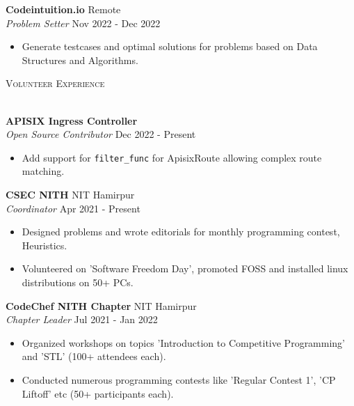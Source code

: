 \documentclass[a4paper]{article}
\newcommand{\lineunder} {
    \vspace*{-8pt} \\
    \hspace*{-18pt} \hrulefill \\
}
\newcommand{\header} [1] {
    {\hspace*{-18pt}\vspace*{6pt} \textsc{#1}}
    \vspace*{-6pt} \lineunder
}
\begin{document}
\textbf{Codeintuition.io} \hfill Remote\\
\textit{Problem Setter} \hfill Nov 2022 - Dec 2022\\
\begin{itemize}
	\item Generate testcases and optimal solutions for problems based on Data Structures and Algorithms.
\end{itemize}
\vspace{1.5mm}


\header{Volunteer Experience}
\vspace{1mm}

\textbf{APISIX Ingress Controller}\\
\textit{Open Source Contributor} \hfill Dec 2022 - Present\\
\begin{itemize}
	\item Add support for \texttt{filter\_func} for ApisixRoute allowing complex route matching.
\end{itemize}
\vspace{1.5mm}

\textbf{CSEC NITH} \hfill NIT Hamirpur\\
\textit{Coordinator} \hfill Apr 2021 - Present\\
\begin{itemize}
	\item Designed problems and wrote editorials for monthly programming contest, Heuristics.
	\item Volunteered on 'Software Freedom Day', promoted FOSS and installed linux distributions on 50+ PCs.
\end{itemize}
\vspace{1.5mm}

\textbf{CodeChef NITH Chapter} \hfill NIT Hamirpur\\
\textit{Chapter Leader} \hfill Jul 2021 - Jan 2022\\
\begin{itemize}
	\item Organized workshops on topics 'Introduction to Competitive Programming' and 'STL' (100+ attendees each).
	\item Conducted numerous programming contests like 'Regular Contest 1', 'CP Liftoff' etc (50+ participants each).
\end{itemize}
\vspace{1.5mm}
\end{document}
